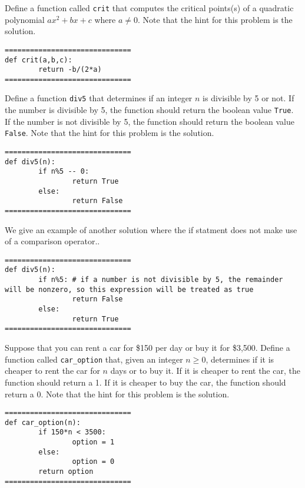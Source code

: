 \documentclass{ximera}
\begin{document}
\begin{question}
	Define a function called \verb|crit| that computes the critical points(s) of a quadratic polynomial $ax^2+bx+c$ where $a\neq 0$. Note that the hint for this problem is the solution.
	\begin{hint}
\begin{verbatim}
==============================
def crit(a,b,c):
        return -b/(2*a)
==============================
\end{verbatim}
	\end{hint}
\end{question}

\begin{question}
	Define a function \verb|div5| that determines if an integer $n$ is divisible by 5 or not. If the number is divisible by 5, the function should return the boolean value \verb|True|. If the number is not divisible by 5, the function should return the boolean value \verb|False|.  Note that the hint for this problem is the solution.
	\begin{hint}
\begin{verbatim}
==============================
def div5(n):
        if n%5 -- 0:
                return True
        else:
                return False
==============================
\end{verbatim}
We give an example of another solution where the if statment does not make use of a comparison operator..

\begin{verbatim}
==============================
def div5(n):
        if n%5: # if a number is not divisible by 5, the remainder will be nonzero, so this expression will be treated as true
                return False
        else:
                return True
==============================
\end{verbatim}
	\end{hint}
\end{question}

\begin{question}
	Suppose that you can rent a car for \$150 per day or buy it for \$3,500. Define a function called \verb|car_option| that, given an integer $n\geq 0$, determines if it is cheaper to rent the car for $n$ days or to buy it. If it is cheaper to rent the car, the function should return a 1. If it is cheaper to buy the car, the function should return a 0. Note that the hint for this problem is the solution.
	\begin{hint}
\begin{verbatim}
==============================
def car_option(n):
        if 150*n < 3500:
                option = 1
        else:
                option = 0
        return option
==============================
\end{verbatim}
	\end{hint}
\end{question}
\end{document}
